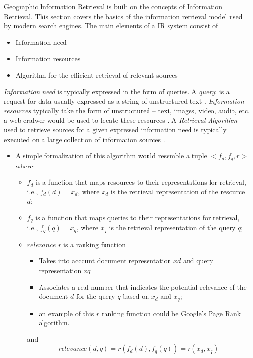 \documentclass[10pt, conference, compsocconf]{IEEEtran}
\begin{document}
 Geographic Information Retrieval is built on the concepts of Information Retrieval. This section covers the basics of the information retrieval model used by modern search engines. The main elements of a IR system consist of
\par
 \begin{itemize}
     \item Information need 
     \item Information resources 
     \item Algorithm for the efficient retrieval of relevant sources 
 \end{itemize}

\textit{Information need} is typically expressed in the form of queries. A \textit{query}: is a request for data usually expressed as a string of unstructured text \cite{Korfhage:2008fe}. \textit{Information resources} typically take the form of unstructured – text, images, video, audio, etc. a web-cralwer would be used to locate these resources \cite{Korfhage:2008fe}. A \textit{Retrieval Algorithm} used to retrieve sources for a given expressed information need is typically executed on a large collection of information sources \cite{Korfhage:2008fe}.
\begin{itemize}
    \item A simple formalization of this algorithm would resemble a tuple \(<f_d,f_q,r>\) where:
    \begin{itemize}
        \item \(f_d\) is a function that maps resources to their representations for retrieval, i.e., \(f_d(d) = x_d\), where \(x_d\) is the retrieval representation of the resource \(d\);
        \item \(f_q\) is a function that maps queries to their representations for retrieval, i.e., \(f_q(q) = x_q\), where \(x_q\) is the retrieval representation of the query \(q\);
        \item \(relevance\) \(r\) is a ranking function
        \begin{itemize}
            \item Takes into account document representation \(xd\) and query representation \(xq\)
            \item Associates a real number that indicates the potential relevance of the document \(d\) for the query \(q\) based on \(x_d\) and \(x_q\);
            \item an example of this \(r\) ranking function could be Google's Page Rank algorithm.
        \end{itemize} and \[relevance(d, q) = r(f_d(d), f_q(q)) = r(x_d,x_q)\]
    \end{itemize}
\end{itemize}
\end{document}

